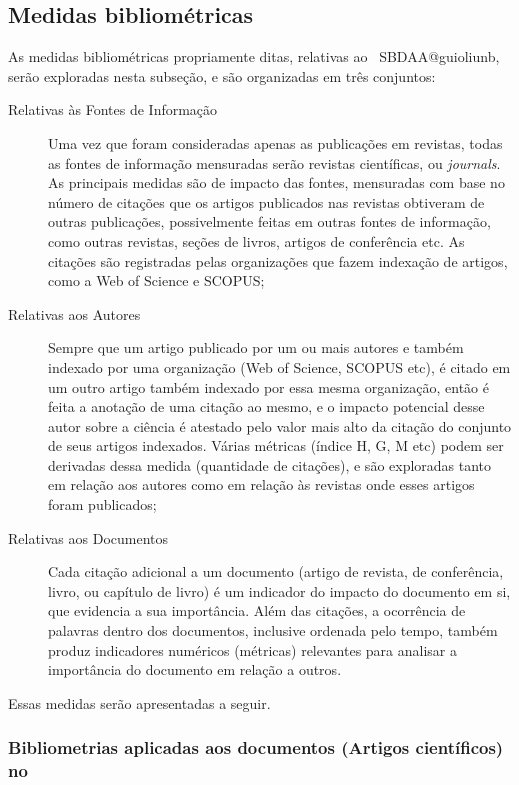 \subsection{Medidas bibliométricas}

As medidas bibliométricas propriamente ditas, relativas ao \dataset\ SBDAA@guioliunb, serão exploradas nesta subseção, e são organizadas em três conjuntos:
\begin{description}
    \item [Relativas às Fontes de Informação] Uma vez que foram consideradas apenas as publicações em revistas, todas as fontes de informação mensuradas serão revistas científicas, ou \textit{journals}. As principais medidas são de impacto das fontes, mensuradas com base no número de citações que os artigos publicados nas revistas obtiveram de outras publicações, possivelmente feitas em outras fontes de informação, como outras revistas, seções de livros, artigos de conferência etc. As citações são registradas pelas organizações que fazem indexação de artigos, como a Web of Science e SCOPUS;
    \item [Relativas aos Autores] Sempre que um artigo publicado por um ou mais autores e também indexado por uma organização (Web of Science,  SCOPUS etc), é citado em um outro artigo também indexado por essa mesma organização, então é feita a anotação de uma citação ao mesmo, e o impacto potencial desse autor sobre a ciência é atestado pelo valor mais alto da citação do conjunto de seus artigos indexados. Várias métricas (índice H, G, M etc) podem ser derivadas dessa medida (quantidade de citações), e são exploradas tanto em relação aos autores como em relação às revistas onde esses artigos foram publicados;
    \item [Relativas aos Documentos] Cada citação adicional a  um documento (artigo de revista, de conferência, livro, ou  capítulo de livro) é um indicador do impacto do documento em si, que evidencia a sua importância. Além das citações, a ocorrência de palavras dentro dos documentos, inclusive ordenada pelo tempo, também produz indicadores numéricos (métricas) relevantes para analisar a importância do documento em relação a outros. 
\end{description}

Essas medidas serão apresentadas a seguir.

\subsubsection{Bibliometrias aplicadas aos documentos (Artigos científicos) no \dataset}

